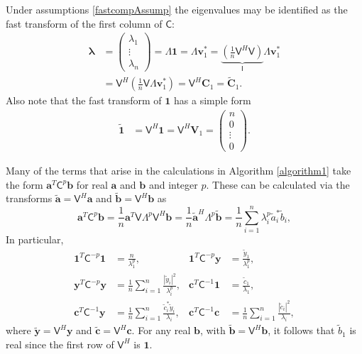 \documentclass[twocolumn]{svjour3}          %
\newcommand{\bm}[1]{\boldsymbol{#1}}
\newcommand{\vlambda}{{\bm{\lambda}}}
\newcommand{\va}{\bm{a}}
\newcommand{\vb}{\bm{b}}
\newcommand{\vc}{\bm{c}}
\newcommand{\vC}{\bm{C}}
\newcommand{\vv}{\bm{v}}
\newcommand{\vV}{\bm{V}}
\newcommand{\vy}{\bm{y}}
\newcommand{\vone}{\bm{1}}
\newcommand{\mC}{\mathsf{C}}
\newcommand{\mCInv}{{\mathsf{C}^{-1}}}
\newcommand{\mLambda}{\mathsf{\Lambda}}
\newcommand{\mV}{\mathsf{V}}
\def\abs#1{\ensuremath{\left \lvert #1 \right \rvert}}
\begin{document}
Under assumptions \eqref{fastcompAssump} the eigenvalues may be identified as the fast transform of the first column of $\mC$:
\begin{align}
\nonumber
\vlambda 
& = \begin{pmatrix}
\lambda_1 \\ \vdots \\ \lambda_n
\end{pmatrix} = \mLambda \vone = \mLambda \vv_1^* 
= \underbrace{\left( \frac 1n \mV^H  \mV \right) }_{\mathsf{I}} \mLambda \vv_1^* \\
&= \mV^H \left( \frac 1n \mV \mLambda \vv_1^* \right)
= \mV^H \vC_1 =  \widetilde{\vC}_1.
\label{eqn:fast_transform_to_eigvalues}
\end{align}
Also note that the fast transform of $\vone$ has a simple form
\begin{align*} 
\widetilde{\vone}
& = \mV^H \vone = \mV^H \vV_1 = \begin{pmatrix}n  \\ 0 \\ \vdots \\ 0 \end{pmatrix}.
\label{eqn:fast_transform_one}
\end{align*}

Many of the terms that arise in the calculations in  Algorithm \ref{algorithm1} take the form $\va^T\mC^{p}\vb$ for real $\va$ and $\vb$ and integer $p$.  These can be calculated via the transforms $\widetilde{\va} = \mV^H \va$ and $\widetilde{\vb} = \mV^H \vb$ as 
\begin{equation*}
\va^T\mC^p\vb = \frac 1n \va^T \mV \mLambda^p \mV^H \vb
= \frac 1n \widetilde{\va}^H\mLambda^p \widetilde{\vb}
= \frac 1n \sum_{i=1}^n \lambda_i^p \widetilde{a}_i^* \widetilde{b}_i, 
\end{equation*}
In particular,
\begin{align*}
\vone^T\mC^{-p}\vone & = \frac{n}{\lambda_1^p},
&
\vone^T\mC^{-p}\vy &= \frac{\widetilde{y}_1}{\lambda_1^p},
\\
\vy^T\mC^{-p} \vy &= \frac 1n \sum_{i=1}^n \frac{\abs{\widetilde{y}_i}^2}{\lambda_i^p},
&
\vc^T\mCInv \vone &= \frac{\widetilde{c}_1}{\lambda_1},\\
\vc^T\mCInv \vy &= \frac 1n \sum_{i=1}^n \frac{\widetilde{c}_i^* \widetilde{y}_i}{\lambda_i}, & 
\vc^T\mCInv \vc &= \frac 1n \sum_{i=1}^n \frac{\abs{\widetilde{c}_i}^2}{\lambda_i},
\end{align*}
where $\widetilde{\vy} = \mV^H \vy$ and 
$\widetilde{\vc} = \mV^H \vc$.  For any real $\vb$, with $\widetilde{\vb} = \mV^H\vb$, it follows that $\widetilde{b}_1$ is real since the first row of $\mV^H$ is $\vone$.
\end{document}
